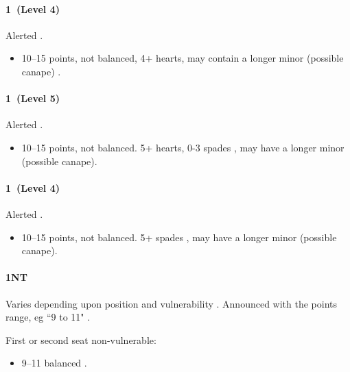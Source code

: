 {\color{CadetBlue}

\paragraph{1\hearts~(Level 4)}

Alerted .

\begin{itemize}
\item 10--15 points, not balanced, 4+ hearts, may contain a longer minor (possible canape) .
\end{itemize}
}

{\it

\paragraph{1\spades~(Level 5)}

Alerted .

\begin{itemize}
\item 10--15 points, not balanced. 5+ hearts, 0-3 spades , may have a longer minor (possible canape).
\end{itemize}

}

{\color{CadetBlue}

\paragraph{1\spades~(Level 4)}

Alerted .

\begin{itemize}
\item 10--15 points, not balanced. 5+ spades , may have a longer minor (possible canape).
\end{itemize}
}

\paragraph{1NT}

Varies depending upon position and vulnerability . Announced with the points range, eg ``9 to 11" .

First or second seat non-vulnerable:
\begin{itemize}
	\item 9--11 balanced .
\end{itemize}

